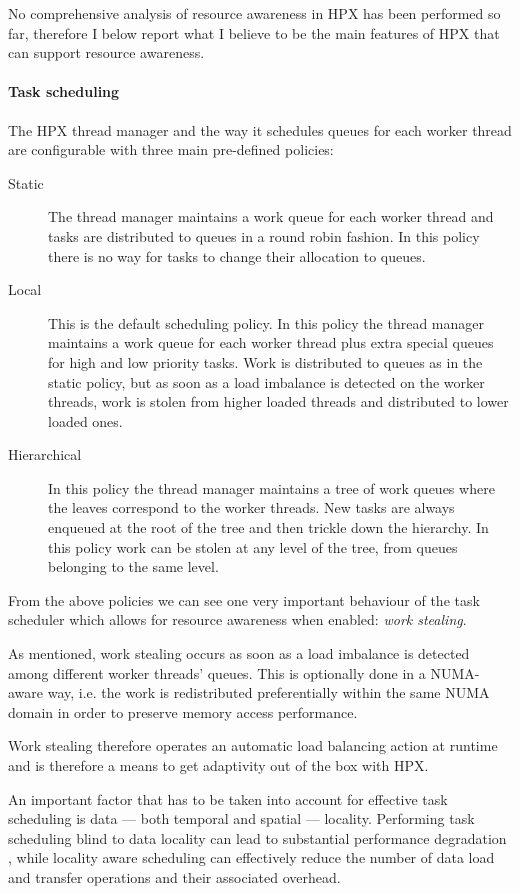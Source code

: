 No comprehensive analysis of resource awareness in HPX has been performed so far, therefore I below report what I believe to be the main features of HPX that can support resource awareness.
~\\ 

\paragraph{Task scheduling}
The HPX thread manager and the way it schedules queues for each worker thread are configurable with three main pre-defined policies\cite{heller2017hpx,amatya2014parallel}:
\begin{description}
	\item [Static] The thread manager maintains a work queue for each worker thread and tasks are distributed to queues in a round robin fashion. In this policy there is no way for tasks to change their allocation to queues.
	\item [Local] This is the default scheduling policy. In this policy the thread manager maintains a work queue for each worker thread plus extra special queues for high and low priority tasks. Work is distributed to queues as in the static policy, but as soon as a load imbalance is detected on the worker threads, work is stolen from higher loaded threads and distributed to lower loaded ones.
	\item [Hierarchical] In this policy the thread manager maintains a tree of work queues where the leaves correspond to the worker threads. New tasks are always enqueued at the root of the tree and then trickle down the hierarchy. In this policy work can be stolen at any level of the tree, from queues belonging to the same level.
\end{description}

From the above policies we can see one very important behaviour of the task scheduler which allows for resource awareness when enabled: \emph{work stealing}.

As mentioned, work stealing occurs as soon as a load imbalance is detected among different worker threads' queues.
This is optionally done in a NUMA-aware way, i.e. the work is redistributed preferentially within the same NUMA domain in order to preserve memory access performance.

Work stealing therefore operates an automatic load balancing action at runtime and is therefore a means to get adaptivity out of the box with HPX.

An important factor that has to be taken into account for effective task scheduling is data --- both temporal and spatial --- locality. Performing task scheduling blind to data locality can lead to substantial performance degradation \cite{connelly1994workload}, while locality aware scheduling can effectively reduce the number of data load and transfer operations and their associated overhead.


